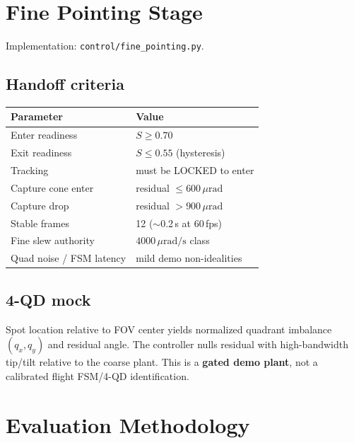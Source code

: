 \documentclass[11pt,a4paper]{article}
\begin{document}
\section{Fine Pointing Stage}

Implementation: \texttt{control/fine\_pointing.py}.

\subsection{Handoff criteria}
\begin{center}
\begin{tabular}{@{}ll@{}}
\toprule
Parameter & Value \\
\midrule
Enter readiness & $S\ge 0.70$ \\
Exit readiness & $S\le 0.55$ (hysteresis) \\
Tracking & must be LOCKED to enter \\
Capture cone enter & residual $\le 600\,\mu\mathrm{rad}$ \\
Capture drop & residual $>900\,\mu\mathrm{rad}$ \\
Stable frames & 12 ($\sim$0.2\,s at 60\,fps) \\
Fine slew authority & $4000\,\mu\mathrm{rad/s}$ class \\
Quad noise / FSM latency & mild demo non-idealities \\
\bottomrule
\end{tabular}
\end{center}

\subsection{4-QD mock}
Spot location relative to FOV center yields normalized quadrant imbalance $(q_x,q_y)$ and residual angle.
The controller nulls residual with high-bandwidth tip/tilt relative to the coarse plant.
This is a \textbf{gated demo plant}, not a calibrated flight FSM/4-QD identification.

\section{Evaluation Methodology}
\end{document}
